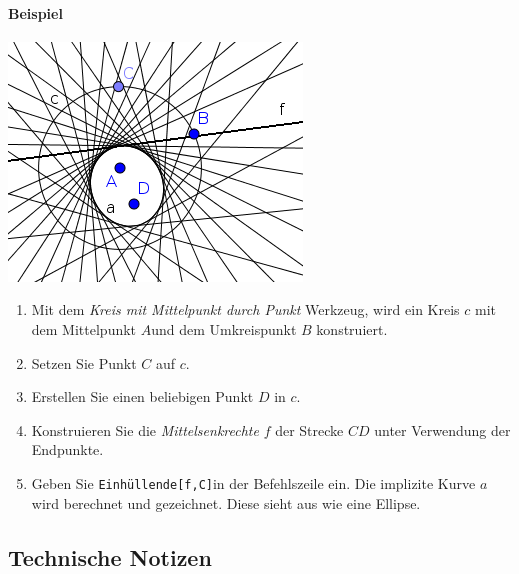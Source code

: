 \documentclass{article}
\begin{document}

\paragraph{Beispiel}
\begin{center}
\includegraphics[scale=0.5]{Envelope-example}
\end{center}
\begin{enumerate}
    \item Mit dem \textit{Kreis mit Mittelpunkt durch Punkt} Werkzeug, wird ein Kreis $c$ mit dem Mittelpunkt $A$und dem Umkreispunkt $B$ konstruiert.
    \item Setzen Sie Punkt $C$ auf $c$.
    \item Erstellen Sie einen beliebigen Punkt $D$ in $c$.
    \item Konstruieren Sie die \textit{Mittelsenkrechte} $f$ der Strecke $CD$ unter Verwendung der Endpunkte.
    \item Geben Sie \texttt{Einhüllende[f,C]}in der Befehlszeile ein. Die implizite Kurve $a$ wird berechnet und gezeichnet. Diese sieht aus wie eine Ellipse.
\end{enumerate}


\subsection{Technische Notizen}
\end{document}
